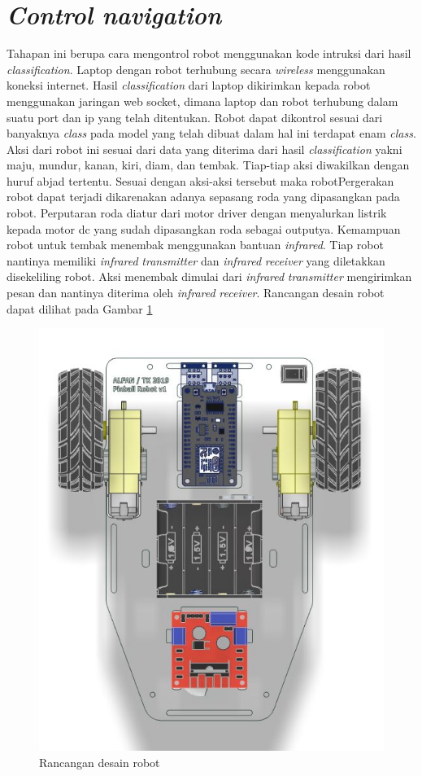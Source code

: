 \section{\emph{Control navigation}} 
Tahapan ini berupa cara mengontrol robot menggunakan kode intruksi dari hasil \emph{classification}. Laptop dengan robot terhubung secara \emph{wireless} menggunakan koneksi internet. Hasil \emph{classification} dari laptop dikirimkan kepada robot menggunakan jaringan web socket, dimana laptop dan robot terhubung dalam suatu port dan ip yang telah ditentukan. Robot dapat dikontrol sesuai dari banyaknya \emph{class} pada model yang telah dibuat dalam hal ini terdapat enam \emph{class}. Aksi dari robot ini sesuai dari data yang diterima dari hasil \emph{classification} yakni maju, mundur, kanan, kiri, diam, dan tembak. Tiap-tiap aksi diwakilkan dengan huruf abjad tertentu. Sesuai dengan aksi-aksi tersebut maka robotPergerakan robot dapat terjadi dikarenakan adanya sepasang roda yang dipasangkan pada robot. Perputaran roda diatur dari motor driver dengan menyalurkan listrik kepada motor dc yang sudah dipasangkan roda sebagai outputya. Kemampuan robot untuk tembak menembak menggunakan bantuan \emph{infrared}. Tiap robot nantinya memiliki \emph{infrared} \emph{transmitter} dan \emph{infrared} \emph{receiver} yang diletakkan disekeliling robot. Aksi menembak dimulai dari \emph{infrared} \emph{transmitter} mengirimkan pesan dan nantinya diterima oleh \emph{infrared} \emph{receiver}. Rancangan desain robot dapat dilihat pada Gambar \ref{fig:rancanganrobot}

\begin{figure}[!h]
  \centering
  \includegraphics[width=0.3\linewidth]{../Gambar/rancnaganrobot.jpg}
  \caption{Rancangan desain robot}
  \label{fig:rancanganrobot}
\end{figure}
